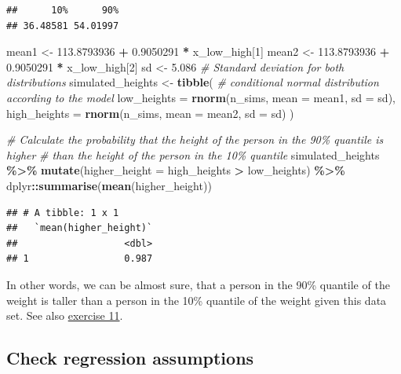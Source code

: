\documentclass[
]{book}
\newenvironment{Shaded}{\begin{snugshade}}{\end{snugshade}}
\newcommand{\AttributeTok}[1]{\textcolor[rgb]{0.13,0.29,0.53}{#1}}
\newcommand{\CommentTok}[1]{\textcolor[rgb]{0.56,0.35,0.01}{\textit{#1}}}
\newcommand{\DecValTok}[1]{\textcolor[rgb]{0.00,0.00,0.81}{#1}}
\newcommand{\FloatTok}[1]{\textcolor[rgb]{0.00,0.00,0.81}{#1}}
\newcommand{\FunctionTok}[1]{\textcolor[rgb]{0.13,0.29,0.53}{\textbf{#1}}}
\newcommand{\NormalTok}[1]{#1}
\newcommand{\OtherTok}[1]{\textcolor[rgb]{0.56,0.35,0.01}{#1}}
\newcommand{\SpecialCharTok}[1]{\textcolor[rgb]{0.81,0.36,0.00}{\textbf{#1}}}
\begin{document}
\begin{verbatim}
##      10%      90% 
## 36.48581 54.01997
\end{verbatim}

\begin{Shaded}
\begin{Highlighting}[]
\NormalTok{mean1 }\OtherTok{\textless{}{-}} \FloatTok{113.8793936} \SpecialCharTok{+} \FloatTok{0.9050291} \SpecialCharTok{*}\NormalTok{ x\_low\_high[}\DecValTok{1}\NormalTok{]}
\NormalTok{mean2 }\OtherTok{\textless{}{-}} \FloatTok{113.8793936} \SpecialCharTok{+} \FloatTok{0.9050291} \SpecialCharTok{*}\NormalTok{ x\_low\_high[}\DecValTok{2}\NormalTok{]}
\NormalTok{sd }\OtherTok{\textless{}{-}} \FloatTok{5.086}  \CommentTok{\# Standard deviation for both distributions}
\NormalTok{simulated\_heights }\OtherTok{\textless{}{-}} \FunctionTok{tibble}\NormalTok{(}
  \CommentTok{\# conditional normal distribution according to the model}
  \AttributeTok{low\_heights =} \FunctionTok{rnorm}\NormalTok{(n\_sims, }\AttributeTok{mean =}\NormalTok{ mean1, }\AttributeTok{sd =}\NormalTok{ sd),}
  \AttributeTok{high\_heights =} \FunctionTok{rnorm}\NormalTok{(n\_sims, }\AttributeTok{mean =}\NormalTok{  mean2, }\AttributeTok{sd =}\NormalTok{ sd)}
\NormalTok{)}

\CommentTok{\# Calculate the probability that the height of the person in the 90\% quantile is higher}
\CommentTok{\# than the height of the person in the 10\% quantile}
\NormalTok{simulated\_heights }\SpecialCharTok{\%\textgreater{}\%}
  \FunctionTok{mutate}\NormalTok{(}\AttributeTok{higher\_height =}\NormalTok{ high\_heights }\SpecialCharTok{\textgreater{}}\NormalTok{ low\_heights) }\SpecialCharTok{\%\textgreater{}\%}
\NormalTok{  dplyr}\SpecialCharTok{::}\FunctionTok{summarise}\NormalTok{(}\FunctionTok{mean}\NormalTok{(higher\_height))}
\end{Highlighting}
\end{Shaded}

\begin{verbatim}
## # A tibble: 1 x 1
##   `mean(higher_height)`
##                   <dbl>
## 1                 0.987
\end{verbatim}

In other words, we can be almost sure, that a person in the 90\% quantile of the weight
is taller than a person in the 10\% quantile of the weight given this data set.
See also \hyperref[exercise11_simpl_lin_r]{exercise 11}.

\subsection{Check regression assumptions}\label{check-regression-assumptions}
\end{document}
